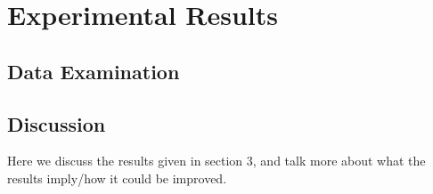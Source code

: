 \section{Experimental Results}

\subsection{Data Examination}

\subsection{Discussion}
Here we discuss the results given in section 3, and talk more about what the results imply/how it could be improved.